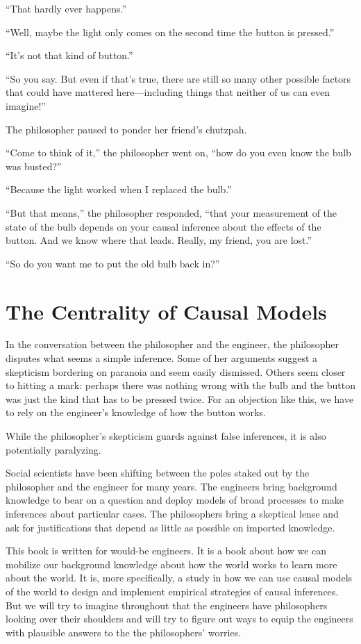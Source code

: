 \documentclass[12pt,]{book}
\begin{document}
``That hardly ever happens.''

``Well, maybe the light only comes on the second time the button is pressed.''

``It's not that kind of button.''

``So you say. But even if that's true, there are still so many other possible factors that could have mattered here---including things that neither of us can even imagine!''

The philosopher paused to ponder her friend's chutzpah.

``Come to think of it,'' the philosopher went on, ``how do you even know the bulb was busted?''

``Because the light worked when I replaced the bulb.''

``But that means,'' the philosopher responded, ``that your measurement of the state of the bulb depends on your causal inference about the effects of the button. And we know where that leads. Really, my friend, you are lost.''

``So do you want me to put the old bulb back in?''

\hypertarget{the-centrality-of-causal-models}{%
\section{The Centrality of Causal Models}\label{the-centrality-of-causal-models}}

In the conversation between the philosopher and the engineer, the philosopher disputes what seems a simple inference. Some of her arguments suggest a skepticism bordering on paranoia and seem easily dismissed. Others seem closer to hitting a mark: perhaps there was nothing wrong with the bulb and the button was just the kind that has to be pressed twice. For an objection like this, we have to rely on the engineer's knowledge of how the button works.

While the philosopher's skepticism guards against false inferences, it is also potentially paralyzing.

Social scientists have been shifting between the poles staked out by the philosopher and the engineer for many years. The engineers bring background knowledge to bear on a question and deploy models of broad processes to make inferences about particular cases. The philosophers bring a skeptical lense and ask for justifications that depend as little as possible on imported knowledge.

This book is written for would-be engineers. It is a book about how we can mobilize our background knowledge about how the world works to learn more about the world. It is, more specifically, a study in how we can use causal models of the world to design and implement empirical strategies of causal inferences. But we will try to imagine throughout that the engineers have philosophers looking over their shoulders and will try to figure out ways to equip the engineers with plausible answers to the the philosophers' worries.
\end{document}
